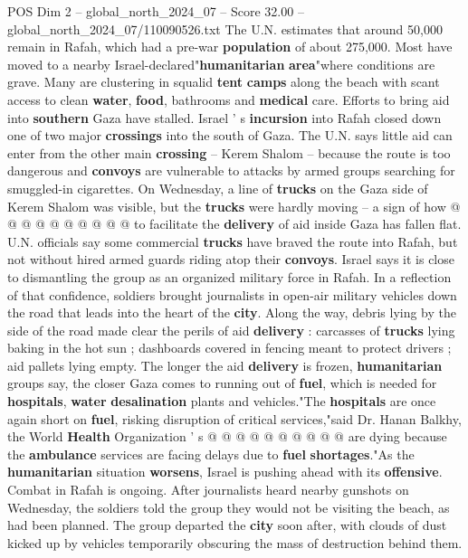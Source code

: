 \begin{textsample}{POS Dim 2 – global\_north\_2024\_07 – Score 32.00 – global\_north\_2024\_07/110090526.txt}
The U.N. estimates that around 50,000 remain in Rafah, which had a pre-war \textbf{population} of about 275,000.
Most have moved to a nearby Israel-declared"\textbf{humanitarian} \textbf{area}"where conditions are grave.
Many are clustering in squalid \textbf{tent} \textbf{camps} along the beach with scant access to clean \textbf{water}, \textbf{food}, bathrooms and \textbf{medical} care.
Efforts to bring aid into \textbf{southern} Gaza have stalled.
Israel ' s \textbf{incursion} into Rafah closed down one of two major \textbf{crossings} into the south of Gaza.
The U.N. says little aid can enter from the other main \textbf{crossing} -- Kerem Shalom -- because the route is too dangerous and \textbf{convoys} are vulnerable to attacks by armed groups searching for smuggled-in cigarettes.
On Wednesday, a line of \textbf{trucks} on the Gaza side of Kerem Shalom was visible, but the \textbf{trucks} were hardly moving -- a sign of how @ @ @ @ @ @ @ @ @ @ to facilitate the \textbf{delivery} of aid inside Gaza has fallen flat.
U.N. officials say some commercial \textbf{trucks} have braved the route into Rafah, but not without hired armed guards riding atop their \textbf{convoys}.
Israel says it is close to dismantling the group as an organized military force in Rafah.
In a reflection of that confidence, soldiers brought journalists in open-air military vehicles down the road that leads into the heart of the \textbf{city}.
Along the way, debris lying by the side of the road made clear the perils of aid \textbf{delivery} : carcasses of \textbf{trucks} lying baking in the hot sun ; dashboards covered in fencing meant to protect drivers ; aid pallets lying empty.
The longer the aid \textbf{delivery} is frozen, \textbf{humanitarian} groups say, the closer Gaza comes to running out of \textbf{fuel}, which is needed for \textbf{hospitals}, \textbf{water} \textbf{desalination} plants and vehicles."The \textbf{hospitals} are once again short on \textbf{fuel}, risking disruption of critical services,"said Dr.
Hanan Balkhy, the World \textbf{Health} Organization ' s @ @ @ @ @ @ @ @ @ @ are dying because the \textbf{ambulance} services are facing delays due to \textbf{fuel} \textbf{shortages}."As the \textbf{humanitarian} situation \textbf{worsens}, Israel is pushing ahead with its \textbf{offensive}.
Combat in Rafah is ongoing.
After journalists heard nearby gunshots on Wednesday, the soldiers told the group they would not be visiting the beach, as had been planned.
The group departed the \textbf{city} soon after, with clouds of dust kicked up by vehicles temporarily obscuring the mass of destruction behind them.

\end{textsample}
